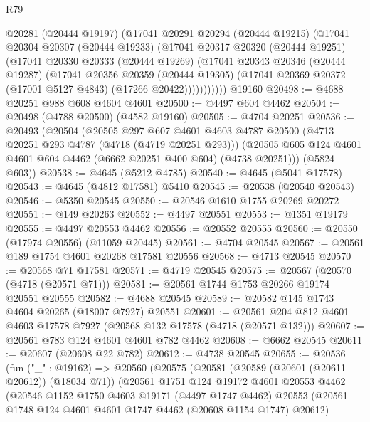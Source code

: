 \begin{lexlean}{R79}
\begin{coremodule}
          @20281
          (@20444 @19197)
          (@17041
            @20291
            @20294
            (@20444 @19215)
            (@17041
              @20304
              @20307
              (@20444 @19233)
              (@17041
                @20317
                @20320
                (@20444 @19251)
                (@17041
                  @20330
                  @20333
                  (@20444 @19269)
                  (@17041
                    @20343
                    @20346
                    (@20444 @19287)
                    (@17041
                      @20356
                      @20359
                      (@20444 @19305)
                      (@17041 @20369 @20372 (@17001 @5127 @4843) (@17266 @20422)))))))))))
    @19160
@20498 := @4688 @20251 @988 @608 @4604 @4601
@20500 := @4497 @604 @4462
@20504 := @20498 (@4788 @20500) (@4582 @19160)
@20505 := @4704 @20251
@20536 := @20493
    (@20504
      (@20505
        @297
        @607
        @4601
        @4603
        @4787
        @20500
        (@4713 @20251 @293 @4787 (@4718 (@4719 @20251 @293)))
        (@20505 @605 @124 @4601 @4601 @604 @4462 (@6662 @20251 @400 @604) (@4738 @20251)))
      (@5824 @603))
@20538 := @4645 (@5212 @4785)
@20540 := @4645 (@5041 @17578)
@20543 := @4645 (@4812 @17581) @5410
@20545 := @20538 (@20540 @20543)
@20546 := @5350 @20545
@20550 := @20546 @1610 @1755 @20269 @20272
@20551 := @149 @20263
@20552 := @4497 @20551
@20553 := @1351 @19179
@20555 := @4497 @20553 @4462
@20556 := @20552 @20555
@20560 := @20550 (@17974 @20556) (@11059 @20445)
@20561 := @4704 @20545
@20567 := @20561 @189 @1754 @4601 @20268 @17581 @20556
@20568 := @4713 @20545
@20570 := @20568 @71 @17581
@20571 := @4719 @20545
@20575 := @20567 (@20570 (@4718 (@20571 @71)))
@20581 := @20561 @1744 @1753 @20266 @19174 @20551 @20555
@20582 := @4688 @20545
@20589 := @20582 @145 @1743 @4604 @20265 (@18007 @7927) @20551
@20601 := @20561 @204 @812 @4601 @4603 @17578 @7927 (@20568 @132 @17578 (@4718 (@20571 @132)))
@20607 := @20561 @783 @124 @4601 @4601 @782 @4462
@20608 := @6662 @20545
@20611 := @20607 (@20608 @22 @782)
@20612 := @4738 @20545
@20655 := @20536
    (fun ("_" : @19162) =>
    @20560
      (@20575
        (@20581
          (@20589 (@20601 (@20611 @20612)) (@18034 @71))
          (@20561
            @1751
            @124
            @19172
            @4601
            @20553
            @4462
            (@20546
              @1152
              @1750
              @4603
              @19171
              (@4497 @1747 @4462)
              @20553
              (@20561 @1748 @124 @4601 @4601 @1747 @4462 (@20608 @1154 @1747) @20612)

\end{coremodule}
\end{lexlean}
